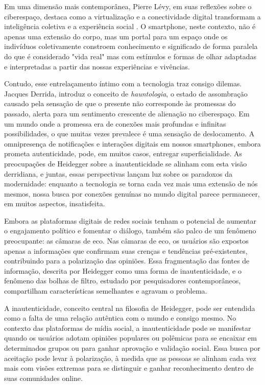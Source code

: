 Em uma dimensão mais contemporânea, Pierre Lévy, em suas reflexões sobre o ciberespaço, destaca como a virtualização e a conectividade digital transformam a inteligência coletiva e a experiência social \cite{2010_Levy_BOOK}. O smartphone, neste contexto, não é apenas uma extensão do corpo, mas um portal para um espaço onde os indivíduos coletivamente constroem conhecimento e significado de forma paralela do que é considerado "vida real" mas com estímulos e formas de olhar adaptadas e interpretadas a partir das nossas experiências e vivências.

Contudo, esse entrelaçamento íntimo com a tecnologia traz consigo dilemas. Jacques Derrida, introduz o conceito de \textit{hauntologia}, o estado de assombração causado pela sensação de que o presente não corresponde às promessas do passado, alerta para um sentimento crescente de alienação no ciberespaço. Em um mundo onde a promessa era de conexões mais profundas e infinitas possibilidades, o que muitas vezes prevalece é uma sensação de deslocamento. A omnipresença de notificações e interações digitais em nossos smartphones, embora prometa autenticidade, pode, em muitos casos, entregar superficialidade. As preocupações de Heidegger sobre a inautenticidade se alinham com esta visão derridiana, e juntas, essas perspectivas lançam luz sobre os paradoxos da modernidade: enquanto a tecnologia se torna cada vez mais uma extensão de nós mesmos, nossa busca por conexões genuínas no mundo digital parece permanecer, em muitos aspectos, insatisfeita.

Embora as plataformas digitais de redes sociais tenham o potencial de aumentar o engajamento político e fomentar o diálogo, também são palco de um fenômeno preocupante: as câmaras de eco. Nas câmaras de eco, os usuários são expostos apenas a informações que confirmam suas crenças e tendências pré-existentes, contribuindo para a polarização das opiniões. Essa fragmentação das fontes de informação, descrita por Heidegger como uma forma de inautenticidade, e o fenômeno das bolhas de filtro, estudado por pesquisadores contemporâneos, compartilham características semelhantes e agravam o problema.

A inautenticidade, conceito central na filosofia de Heidegger, pode ser entendida como a falta de uma relação autêntica com o mundo e consigo mesmo. No contexto das plataformas de mídia social, a inautenticidade pode se manifestar quando os usuários adotam opiniões populares ou polêmicas para se encaixar em determinados grupos ou para ganhar aprovação e validação social. Essa busca por aceitação pode levar à polarização, à medida que as pessoas se alinham cada vez mais com visões extremas para se distinguir e ganhar reconhecimento dentro de suas comunidades online.

